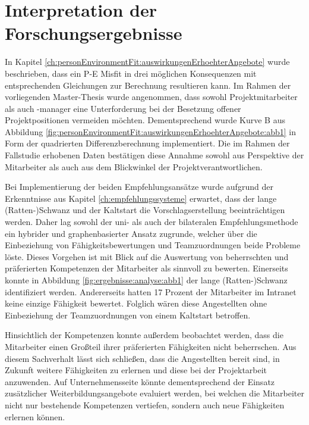 \section{Interpretation der Forschungsergebnisse}
\label{ch:diskussion:interpretation}
In Kapitel \ref{ch:personEnvironmentFit:auswirkungenErhoehterAngebote} wurde beschrieben, dass ein P-E Misfit in drei möglichen Konsequenzen mit entsprechenden Gleichungen zur Berechnung resultieren kann. Im Rahmen der vorliegenden Master-Thesis wurde angenommen, dass sowohl Projektmitarbeiter als auch -manager eine Unterforderung bei der Besetzung offener Projektpositionen vermeiden möchten. Dementsprechend wurde Kurve B aus Abbildung \ref{fig:personEnvironmentFit:auswirkungenErhoehterAngebote:abb1} in Form der quadrierten Differenzberechnung implementiert. Die im Rahmen der Fallstudie erhobenen Daten bestätigen diese Annahme sowohl aus Perspektive der Mitarbeiter als auch aus dem Blickwinkel der Projektverantwortlichen. 

Bei Implementierung der beiden Empfehlungsansätze wurde aufgrund der Erkenntnisse aus Kapitel \ref{ch:empfehlungssysteme} erwartet, dass der lange (Ratten-)Schwanz und der Kaltstart die Vorschlagserstellung beeinträchtigen werden. Daher lag sowohl der uni- als auch der bilateralen Empfehlungsmethode ein hybrider und graphenbasierter Ansatz zugrunde, welcher über die Einbeziehung von Fähigkeitsbewertungen und Teamzuordnungen beide Probleme löste. Dieses Vorgehen ist mit Blick auf die Auswertung von beherrschten und präferierten Kompetenzen der Mitarbeiter als sinnvoll zu bewerten. Einerseits konnte in Abbildung \ref{fig:ergebnisse:analyse:abb1} der lange (Ratten-)Schwanz identifiziert werden. Andererseits hatten 17 Prozent der Mitarbeiter im Intranet keine einzige Fähigkeit bewertet. Folglich wären diese Angestellten ohne Einbeziehung der Teamzuordnungen von einem Kaltstart betroffen.

Hinsichtlich der Kompetenzen konnte außerdem beobachtet werden, dass die Mitarbeiter einen Großteil ihrer präferierten Fähigkeiten nicht beherrschen. Aus diesem Sachverhalt lässt sich schließen, dass die Angestellten bereit sind, in Zukunft weitere Fähigkeiten zu erlernen und diese bei der Projektarbeit anzuwenden. Auf Unternehmensseite könnte dementsprechend der Einsatz zusätzlicher Weiterbildungsangebote evaluiert werden, bei welchen die Mitarbeiter nicht nur bestehende Kompetenzen vertiefen, sondern auch neue Fähigkeiten erlernen können.

